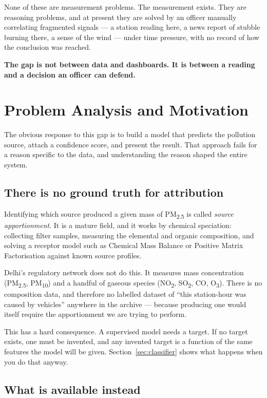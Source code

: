 \documentclass[11pt,a4paper]{article}
\newcommand{\keyclaim}[1]{%
  \par\vspace{0.7ex}\noindent
  \colorbox{vwash}{\parbox{\dimexpr\linewidth-2\fboxsep}{%
    \color{vblack}\textbf{#1}}}%
  \par\vspace{0.9ex}}
\newcommand{\NOx}{NO\textsubscript{2}}
\newcommand{\SOx}{SO\textsubscript{2}}
\newcommand{\PM}{PM\textsubscript{2.5}}
\begin{document}
None of these are measurement problems. The measurement exists. They are reasoning
problems, and at present they are solved by an officer manually correlating
fragmented signals --- a station reading here, a news report of stubble burning
there, a sense of the wind --- under time pressure, with no record of how the
conclusion was reached.

\keyclaim{The gap is not between data and dashboards. It is between a reading and a
decision an officer can defend.}

\section{Problem Analysis and Motivation}

The obvious response to this gap is to build a model that predicts the pollution
source, attach a confidence score, and present the result. That approach fails for
a reason specific to the data, and understanding the reason shaped the entire
system.

\subsection{There is no ground truth for attribution}

Identifying which source produced a given mass of \PM{} is called \emph{source
apportionment}. It is a mature field, and it works by chemical speciation:
collecting filter samples, measuring the elemental and organic composition, and
solving a receptor model such as Chemical Mass Balance or Positive Matrix
Factorisation against known source profiles.

Delhi's regulatory network does not do this. It measures mass concentration
(\PM{}, PM\textsubscript{10}) and a handful of gaseous species (\NOx{}, \SOx{},
CO, O\textsubscript{3}). There is no composition data, and therefore no labelled
dataset of ``this station-hour was caused by vehicles'' anywhere in the archive ---
because producing one would itself require the apportionment we are trying to
perform.

This has a hard consequence. A supervised model needs a target. If no target
exists, one must be invented, and any invented target is a function of the same
features the model will be given. Section~\ref{sec:classifier} shows what happens
when you do that anyway.

\subsection{What is available instead}
\end{document}
